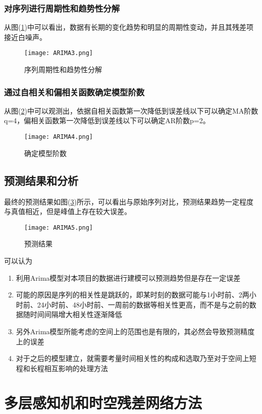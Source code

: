 \subsubsection*{对序列进行周期性和趋势性分解}
从图(\ref{fig:ARIMA3})中可以看出，数据有长期的变化趋势和明显的周期性变动，并且其残差项接近白噪声。

\begin{figure}[ht]
\centering
\texttt{[image: ARIMA3.png]}
\caption{序列周期性和趋势性分解}
\label{fig:ARIMA3}
\end{figure}

\subsubsection*{通过自相关和偏相关函数确定模型阶数}
从图(\ref{fig:ARIMA4})中可以观测出，依据自相关函数第一次降低到误差线以下可以确定MA阶数q=4，偏相关函数第一次降低到误差线以下可以确定AR阶数p=2。

\begin{figure}[ht]
\centering
\texttt{[image: ARIMA4.png]}
\caption{确定模型阶数}
\label{fig:ARIMA4}
\end{figure}
\subsection{预测结果和分析}
最终的预测结果如图(\ref{fig:ARIMA5})所示，可以看出与原始序列对比，预测结果趋势一定程度与真值相近，但是峰值上存在较大误差。
\begin{figure}[ht]
\centering
\texttt{[image: ARIMA5.png]}
\caption{预测结果}
\label{fig:ARIMA5}
\end{figure}
可以认为
\begin{enumerate}
	\item 利用Arima模型对本项目的数据进行建模可以预测趋势但是存在一定误差
	\item 可能的原因是序列的相关性是跳跃的，即某时刻的数据可能与1小时前、2两小时前、24小时前、48小时前、一周前的数据等相关性更高，而不是与之前的数据随时间间隔增大相关性逐渐降低
	\item 另外Arima模型所能考虑的空间上的范围也是有限的，其必然会导致预测精度上的误差
	\item 对于之后的模型建立，就需要考量时间相关性的构成和选取乃至对于空间上短程和长程相互影响的处理方法
\end{enumerate}


\section{多层感知机和时空残差网络方法}
